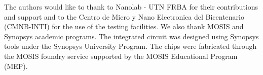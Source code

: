 The authors would like to thank to Nanolab - UTN FRBA for their contributions and support and to the Centro de Micro y Nano Electronica del Bicentenario (CMNB-INTI) for the use of the testing facilities. 
We also thank MOSIS and Synopsys academic programs.
The integrated circuit was designed using Synopsys \cite{synopsys} tools under the Synopsys University Program. The chips were fabricated through the MOSIS foundry service supported by the MOSIS Educational Program (MEP).